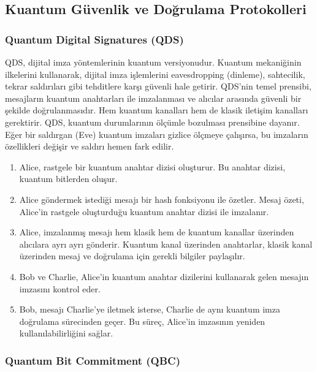 \newpage

\subsection{Kuantum Güvenlik ve Doğrulama Protokolleri}

\subsubsection{Quantum Digital Signatures (QDS)}

QDS, dijital imza yöntemlerinin kuantum versiyonudur. Kuantum mekaniğinin ilkelerini kullanarak, dijital imza işlemlerini eavesdropping (dinleme), sahtecilik, tekrar saldırıları gibi tehditlere karşı güvenli hale getirir. QDS'nin temel prensibi, mesajların kuantum anahtarları ile imzalanması ve alıcılar arasında güvenli bir şekilde doğrulanmasıdır. Hem kuantum kanalları hem de klasik iletişim kanalları gerektirir. QDS, kuantum durumlarının ölçümle bozulması prensibine dayanır. Eğer bir saldırgan (Eve) kuantum imzaları gizlice ölçmeye çalışırsa, bu imzaların özellikleri değişir ve saldırı hemen fark edilir.

\begin{enumerate}
    \item Alice, rastgele bir kuantum anahtar dizisi oluşturur. Bu anahtar dizisi, kuantum bitlerden oluşur.
    \item Alice göndermek istediği mesajı bir hash fonksiyonu ile özetler.  Mesaj özeti, Alice'in rastgele oluşturduğu kuantum anahtar dizisi ile imzalanır. 
    \item Alice, imzalanmış mesajı hem klasik hem de kuantum kanallar üzerinden alıcılara ayrı ayrı gönderir. Kuantum kanal üzerinden anahtarlar, klasik kanal üzerinden mesaj ve doğrulama için gerekli bilgiler paylaşılır.
    \item Bob ve Charlie, Alice'in kuantum anahtar dizilerini kullanarak gelen mesajın imzasını kontrol eder. 
    \item Bob, mesajı Charlie'ye iletmek isterse, Charlie de aynı kuantum imza doğrulama sürecinden geçer. Bu süreç, Alice'in imzasının yeniden kullanılabilirliğini sağlar.
\end{enumerate}

\newpage

\subsubsection{Quantum Bit Commitment (QBC)}


